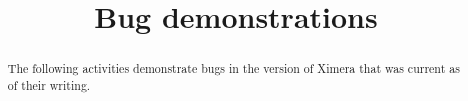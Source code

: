 \documentclass[handout]{ximera}
\title{Bug demonstrations}
\begin{document}
\begin{abstract} The following activities demonstrate bugs in the version of Ximera that was current as of their writing.
\end{abstract}

\maketitle
\end{document}
